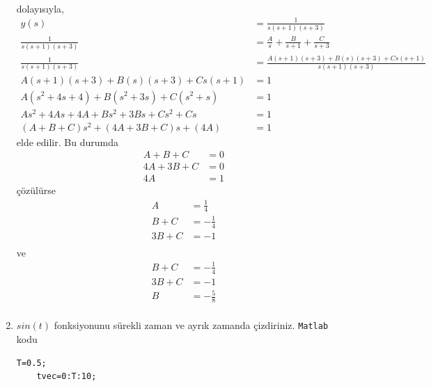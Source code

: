 \begin{enumerate}
\begin{equation}
\begin{split}
        \end{split}
    \end{equation}
    dolayısıyla,
    \begin{equation}
        \begin{split}
            y(s)&=\frac{1}{s(s+1)(s+3)}\\
            \frac{1}{s(s+1)(s+3)}&=\frac{A}{s}+\frac{B}{s+1}+\frac{C}{s+3}\\
            \frac{1}{s(s+1)(s+3)}&=\frac{A(s+1)(s+3)+B(s)(s+3)+Cs(s+1)}{s(s+1)(s+3)}\\
            A(s+1)(s+3)+B(s)(s+3)+Cs(s+1)&=1\\
            A(s^2+4s+4)+B(s^2+3s)+C(s^2+s)&=1\\
            As^2+4As+4A+Bs^2+3Bs+Cs^2+Cs&=1\\
            (A+B+C)s^2+(4A+3B+C)s+(4A)&=1
        \end{split}
        \end{equation}
        elde edilir. Bu durumda 
    \begin{equation}
    \begin{split}
        A+B+C&=0\\
        4A+3B+C&=0\\
        4A&=1
    \end{split}
    \end{equation}
    çözülürse 
    \begin{equation}
        \begin{split}
            A&=\frac{1}{4}\\
            B+C&=-\frac{1}{4}\\
            3B+C&=-1\\
        \end{split}
    \end{equation}
    ve
    \begin{equation}
        \begin{split}
            B+C&=-\frac{1}{4}\\
            3B+C&=-1\\
            B&=-\frac{5}{8}\\
        \end{split}
    \end{equation}
    
    
    \item $sin(t)$ fonksiyonunu sürekli zaman ve ayrık zamanda çizdiriniz.
    \verb|Matlab| kodu
    \begin{lstlisting}[style=Matlab-editor]
    T=0.5;
    tvec=0:T:10;


\end{lstlisting}
\end{enumerate}
